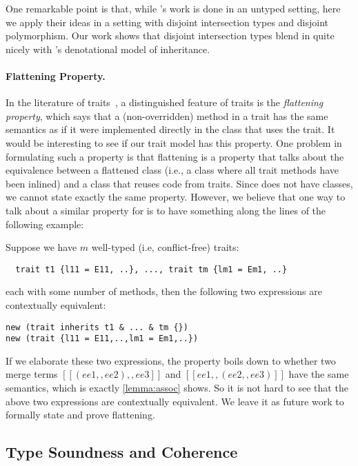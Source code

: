 One remarkable point is that, while \citeauthor{cook1989denotational}'s work is done in
an untyped setting, here we apply their ideas in a setting with
disjoint intersection types and disjoint polymorphism. Our work shows that
disjoint intersection types blend in quite nicely with \citeauthor{cook1989denotational}'s
denotational model of inheritance.

\paragraph{Flattening Property.}

In the literature of traits~\citep{Ducasse_2006, scharli2003traits, JOT:issue_2006_05/article4},
a distinguished feature of traits is the \textit{flattening property}, which says that a (non-overridden) method in a
trait has the same semantics as if it were implemented directly in the class
that uses the trait. It would be interesting to see if our trait model has this
property. One problem in formulating such a property is that flattening is a
property that talks about the equivalence between a flattened class (i.e., a
class where all trait methods have been inlined) and a class that reuses code
from traits. Since \sedel does not have classes, we cannot state exactly the same
property. However, we believe that one way to talk about a similar property for \sedel is to have something
along the lines of the following example:
\begin{example}[Flattening]
Suppose we have $m$ well-typed (i.e, conflict-free) traits:
\begin{lstlisting}
  trait t1 {l11 = E11, ..}, ..., trait tm {lm1 = Em1, ..}
\end{lstlisting}
each with some number of methods, then the following two expressions are contextually equivalent:
\begin{lstlisting}
new (trait inherits t1 & ... & tm {})
new (trait {l11 = E11,..,lm1 = Em1,..})
\end{lstlisting}
\end{example}
If we elaborate these two expressions, the property boils down to whether two
merge terms $[[(ee1 ,, ee2) ,, ee3]]$ and $[[ee1 ,, (ee2 ,, ee3)]]$ have the
same semantics, which is exactly \cref{lemma:assoc} shows. So it is not hard to
see that the above two expressions are contextually equivalent. We leave it as
future work to formally state and prove flattening.

\subsection{Type Soundness and Coherence}

